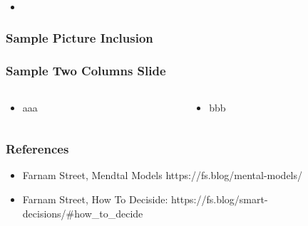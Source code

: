 \begin{frame}[fragile]\frametitle{}
\begin{itemize}
\item 
\end{itemize}
\end{frame}

\begin{frame}[fragile]\frametitle{Sample Picture Inclusion}

\end{frame}


\begin{frame}[fragile]\frametitle{Sample Two Columns Slide}
\begin{columns}
    \begin{column}[T]{0.6\linewidth}
      \begin{itemize}
		\item aaa
	  \end{itemize}

    \end{column}
    \begin{column}[T]{0.4\linewidth}
      \begin{itemize}
		\item bbb
	  \end{itemize}
    \end{column}
  \end{columns}
\end{frame}

\begin{frame}[fragile]\frametitle{References}
\begin{itemize}
\item Farnam Street, Mendtal Models https://fs.blog/mental-models/

\item Farnam Street, How To Deciside: https://fs.blog/smart-decisions/\#how\_to\_decide
\end{itemize}
\end{frame}